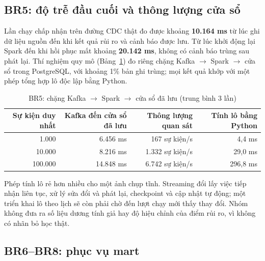 \subsection{BR5: độ trễ đầu cuối và thông lượng cửa sổ}

Lần chạy chấp nhận trên đường CDC thật đo được khoảng \textbf{10.164 ms} từ lúc ghi dữ liệu nguồn đến khi kết quả rủi ro và cảnh báo được lưu. Từ lúc khởi động lại Spark đến khi hồi phục mất khoảng \textbf{20.142 ms}, không có cảnh báo trùng sau phát lại. Thí nghiệm quy mô (Bảng~\ref{tab:br5}) đo riêng chặng Kafka $\rightarrow$ Spark $\rightarrow$ cửa sổ trong PostgreSQL, với khoảng 1\% bản ghi trùng; mọi kết quả khớp với một phép tổng hợp lô độc lập bằng Python.

\begin{table}[H]
\centering\small
\caption{BR5: chặng Kafka $\rightarrow$ Spark $\rightarrow$ cửa sổ đã lưu (trung bình 3 lần)}\label{tab:br5}
\begin{tabular}{@{}rrrr@{}}
\toprule
\textbf{Sự kiện duy nhất} & \textbf{Kafka đến cửa sổ đã lưu} & \textbf{Thông lượng quan sát} & \textbf{Tính lô bằng Python} \\
\midrule
1.000 & 6.456 ms & 167 sự kiện/s & 4,4 ms \\
10.000 & 8.216 ms & 1.332 sự kiện/s & 29,0 ms \\
100.000 & 14.848 ms & 6.742 sự kiện/s & 296,8 ms \\
\bottomrule
\end{tabular}
\end{table}

Phép tính lô rẻ hơn nhiều cho một ảnh chụp tĩnh. Streaming đổi lấy việc tiếp nhận liên tục, xử lý sửa đổi và phát lại, checkpoint và cập nhật tự động; một triển khai lô theo lịch sẽ còn phải chờ đến lượt chạy mới thấy thay đổi. Nhóm không đưa ra số liệu dương tính giả hay độ hiệu chỉnh của điểm rủi ro, vì không có nhãn bỏ học thật.

\subsection{BR6--BR8: phục vụ mart}


